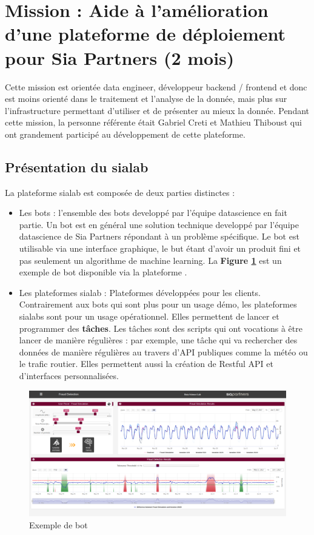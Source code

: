 \documentclass{article} %
\begin{document}
\newpage

\section{Mission : Aide à l'amélioration d'une plateforme de déploiement pour Sia Partners (2 mois)}
Cette mission est orientée data engineer, développeur backend / frontend et donc est moins orienté dans le traitement et l'analyse de la donnée, mais plus sur l'infrastructure permettant d'utiliser et de présenter au mieux la donnée. Pendant cette mission, la personne référente était Gabriel Creti et Mathieu Thiboust qui ont grandement participé au développement de cette plateforme.
 
\subsection{Présentation du sialab}
La plateforme sialab est composée de deux parties distinctes :
\begin{itemize}
	\item Les bots : l'ensemble des bots developpé par l'équipe datascience en fait partie. Un bot est en général une solution technique developpé par l'équipe datascience de Sia Partners répondant à un problème spécifique. Le bot est utilisable via une interface graphique, le but étant d'avoir un produit fini et pas seulement un algorithme de machine learning. La \textbf{Figure \ref{fig:bot}} est un exemple de bot disponible via la plateforme \cite{bot}.
	\item Les plateformes sialab : Plateformes développées pour les clients. Contrairement aux bots qui sont plus pour un usage démo, les plateformes sialabs sont pour un usage opérationnel. Elles permettent de lancer et programmer des \textbf{tâches}. Les tâches sont des scripts qui ont vocations à être lancer de manière régulières : par exemple, une tâche qui va rechercher des données de manière régulières au travers d'API publiques comme la météo ou le trafic routier. Elles permettent aussi la création de Restful API et d'interfaces personnalisées.
\end{itemize}

\begin{figure}[!h]
	\centering
	\includegraphics[keepaspectratio = true,scale=0.25]{bot.png}
	\caption{Exemple de bot}
	\label{fig:bot}
\end{figure}
\end{document}
